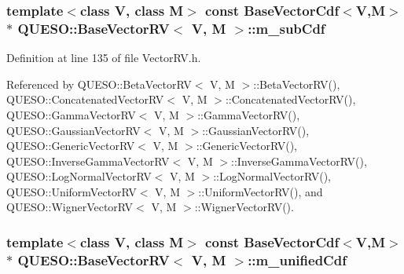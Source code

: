 \hypertarget{class_q_u_e_s_o_1_1_base_vector_r_v_a1a1117671c7fa2e572a9484463bee3a5}{
\subsubsection[{m\-\_\-sub\-Cdf}]{\setlength{\rightskip}{0pt plus 5cm}template$<$class V, class M$>$ const {\bf Base\-Vector\-Cdf}$<$V,M$>$$\ast$ {\bf Q\-U\-E\-S\-O\-::\-Base\-Vector\-R\-V}$<$ V, M $>$\-::m\-\_\-sub\-Cdf\hspace{0.3cm}{\ttfamily [protected]}}}\label{class_q_u_e_s_o_1_1_base_vector_r_v_a1a1117671c7fa2e572a9484463bee3a5}


Definition at line 135 of file Vector\-R\-V.\-h.



Referenced by Q\-U\-E\-S\-O\-::\-Beta\-Vector\-R\-V$<$ V, M $>$\-::\-Beta\-Vector\-R\-V(), Q\-U\-E\-S\-O\-::\-Concatenated\-Vector\-R\-V$<$ V, M $>$\-::\-Concatenated\-Vector\-R\-V(), Q\-U\-E\-S\-O\-::\-Gamma\-Vector\-R\-V$<$ V, M $>$\-::\-Gamma\-Vector\-R\-V(), Q\-U\-E\-S\-O\-::\-Gaussian\-Vector\-R\-V$<$ V, M $>$\-::\-Gaussian\-Vector\-R\-V(), Q\-U\-E\-S\-O\-::\-Generic\-Vector\-R\-V$<$ V, M $>$\-::\-Generic\-Vector\-R\-V(), Q\-U\-E\-S\-O\-::\-Inverse\-Gamma\-Vector\-R\-V$<$ V, M $>$\-::\-Inverse\-Gamma\-Vector\-R\-V(), Q\-U\-E\-S\-O\-::\-Log\-Normal\-Vector\-R\-V$<$ V, M $>$\-::\-Log\-Normal\-Vector\-R\-V(), Q\-U\-E\-S\-O\-::\-Uniform\-Vector\-R\-V$<$ V, M $>$\-::\-Uniform\-Vector\-R\-V(), and Q\-U\-E\-S\-O\-::\-Wigner\-Vector\-R\-V$<$ V, M $>$\-::\-Wigner\-Vector\-R\-V().

\hypertarget{class_q_u_e_s_o_1_1_base_vector_r_v_a31a1d44bbb6a7c030ca31a9577904252}{
\subsubsection[{m\-\_\-unified\-Cdf}]{\setlength{\rightskip}{0pt plus 5cm}template$<$class V, class M$>$ const {\bf Base\-Vector\-Cdf}$<$V,M$>$$\ast$ {\bf Q\-U\-E\-S\-O\-::\-Base\-Vector\-R\-V}$<$ V, M $>$\-::m\-\_\-unified\-Cdf\hspace{0.3cm}{\ttfamily [protected]}}}\label{class_q_u_e_s_o_1_1_base_vector_r_v_a31a1d44bbb6a7c030ca31a9577904252}


